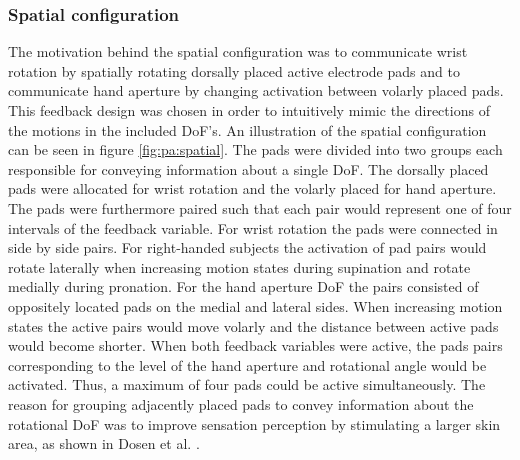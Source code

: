\subsubsection{Spatial configuration}

The motivation behind the spatial configuration was to communicate wrist rotation by spatially rotating dorsally placed active electrode pads and to communicate hand aperture by changing activation between volarly placed pads. 
This feedback design was chosen in order to intuitively mimic the directions of the motions in the included DoF's. An illustration of the spatial configuration can be seen in figure \ref{fig:pa:spatial}. The pads were divided into two groups each responsible for conveying information about a single DoF. The dorsally placed pads were allocated for wrist rotation and the volarly placed for hand aperture. The pads were furthermore paired such that each pair would represent one of four intervals of the feedback variable. For wrist rotation the pads were connected in side by side pairs. For right-handed subjects the activation of pad pairs would rotate laterally when increasing motion states during supination and rotate medially during pronation. For the hand aperture DoF the pairs consisted of oppositely located pads on the medial and lateral sides. When increasing motion states the active pairs would move volarly and the distance between active pads would become shorter. When both feedback variables were active, the pads pairs corresponding to the level of the hand aperture and rotational angle would be activated. Thus, a maximum of four pads could be active simultaneously. The reason for grouping adjacently placed pads to convey information about the rotational DoF was to improve sensation perception by stimulating a larger skin area, as shown in Dosen et al. \cite{Dosen2015}. 
